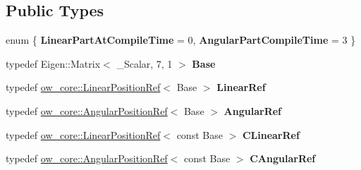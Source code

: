 \subsection*{Public Types}
\begin{DoxyCompactItemize}
\item 
enum \{ {\bfseries Linear\+Part\+At\+Compile\+Time} = 0, 
{\bfseries Angular\+Part\+Compile\+Time} = 3
 \}\hypertarget{structow_1_1traits_3_01ow__core_1_1CartesianPosition_3_01__Scalar_01_4_01_4_a6666d6ca7e5d1d4e6e0557d220d73997}{}\label{structow_1_1traits_3_01ow__core_1_1CartesianPosition_3_01__Scalar_01_4_01_4_a6666d6ca7e5d1d4e6e0557d220d73997}

\item 
typedef Eigen\+::\+Matrix$<$ \+\_\+\+Scalar, 7, 1 $>$ {\bfseries Base}\hypertarget{structow_1_1traits_3_01ow__core_1_1CartesianPosition_3_01__Scalar_01_4_01_4_a4a34066114b5038fcb6ddaa384c55cf5}{}\label{structow_1_1traits_3_01ow__core_1_1CartesianPosition_3_01__Scalar_01_4_01_4_a4a34066114b5038fcb6ddaa384c55cf5}

\item 
typedef \hyperlink{classow__core_1_1LinearPositionRef}{ow\+\_\+core\+::\+Linear\+Position\+Ref}$<$ Base $>$ {\bfseries Linear\+Ref}\hypertarget{structow_1_1traits_3_01ow__core_1_1CartesianPosition_3_01__Scalar_01_4_01_4_afb3ca052578d04e40b3fbdc7672629a9}{}\label{structow_1_1traits_3_01ow__core_1_1CartesianPosition_3_01__Scalar_01_4_01_4_afb3ca052578d04e40b3fbdc7672629a9}

\item 
typedef \hyperlink{classow__core_1_1AngularPositionRef}{ow\+\_\+core\+::\+Angular\+Position\+Ref}$<$ Base $>$ {\bfseries Angular\+Ref}\hypertarget{structow_1_1traits_3_01ow__core_1_1CartesianPosition_3_01__Scalar_01_4_01_4_adcb96275d77a4deede0fa75214305902}{}\label{structow_1_1traits_3_01ow__core_1_1CartesianPosition_3_01__Scalar_01_4_01_4_adcb96275d77a4deede0fa75214305902}

\item 
typedef \hyperlink{classow__core_1_1LinearPositionRef}{ow\+\_\+core\+::\+Linear\+Position\+Ref}$<$ const Base $>$ {\bfseries C\+Linear\+Ref}\hypertarget{structow_1_1traits_3_01ow__core_1_1CartesianPosition_3_01__Scalar_01_4_01_4_afcce0da60530a786e31831aa15cc8cf3}{}\label{structow_1_1traits_3_01ow__core_1_1CartesianPosition_3_01__Scalar_01_4_01_4_afcce0da60530a786e31831aa15cc8cf3}

\item 
typedef \hyperlink{classow__core_1_1AngularPositionRef}{ow\+\_\+core\+::\+Angular\+Position\+Ref}$<$ const Base $>$ {\bfseries C\+Angular\+Ref}\hypertarget{structow_1_1traits_3_01ow__core_1_1CartesianPosition_3_01__Scalar_01_4_01_4_abf304907852eabe23e3f092af7c6e200}{}\label{structow_1_1traits_3_01ow__core_1_1CartesianPosition_3_01__Scalar_01_4_01_4_abf304907852eabe23e3f092af7c6e200}

\end{DoxyCompactItemize}


